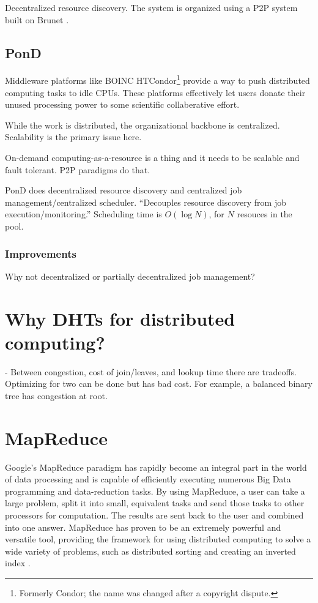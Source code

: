 \documentclass[10pt,letterpaper,twoside]{report}
\begin{document}
Decentralized resource discovery.
The system is organized using a P2P system built on Brunet \cite{brunet}.





\subsection{PonD}

Middleware platforms like BOINC \cite{anderson2004boinc} HTCondor\footnote{Formerly Condor; the name was changed after a copyright dispute.} \cite{thain2005distributed} provide a way to push distributed computing tasks to idle CPUs.
These platforms effectively let users donate their unused processing power to some scientific collaberative effort.

While the work is distributed, the organizational backbone  is centralized.
Scalability is the primary issue here.


On-demand computing-as-a-resource is a thing and it needs to be scalable and fault tolerant.
P2P paradigms do that.

PonD \cite{lee2012pond} does decentralized resource discovery and centralized job management/centralized scheduler.
``Decouples resource discovery from job execution/monitoring.''
Scheduling time is $ O(\log N) $, for $N$ resouces in the pool.

\subsubsection{Improvements}
Why not decentralized or partially decentralized job management?


\section{Why DHTs for distributed computing?}

\cite{malkhi2001viceroy} -  Between congestion, cost of join/leaves, and lookup time there are tradeoffs.  
Optimizing for two can be done but has bad cost.
For example, a balanced binary tree has congestion at root.


\section{MapReduce}

Google's MapReduce \cite{mapreduce} paradigm has rapidly become an integral part in the world of data processing and is capable of efficiently executing numerous Big Data programming and data-reduction tasks.  
By using MapReduce, a user can take a large problem, split it into small, equivalent tasks and send those tasks to other processors for computation.  
The results are sent back to the user and combined into one answer.  
MapReduce has proven to be an extremely powerful and versatile tool, providing the framework for using distributed computing to solve a wide variety of problems, such as distributed sorting and creating an inverted index \cite{mapreduce}. 
\end{document}
